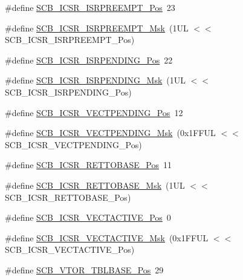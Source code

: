 \begin{DoxyCompactItemize}
\item 
\#define \hyperlink{group___c_m_s_i_s___s_c_b_ga11cb5b1f9ce167b81f31787a77e575df}{S\+C\+B\+\_\+\+I\+C\+S\+R\+\_\+\+I\+S\+R\+P\+R\+E\+E\+M\+P\+T\+\_\+\+Pos}~23
\item 
\#define \hyperlink{group___c_m_s_i_s___s_c_b_gaa966600396290808d596fe96e92ca2b5}{S\+C\+B\+\_\+\+I\+C\+S\+R\+\_\+\+I\+S\+R\+P\+R\+E\+E\+M\+P\+T\+\_\+\+Msk}~(1\+U\+L $<$$<$ S\+C\+B\+\_\+\+I\+C\+S\+R\+\_\+\+I\+S\+R\+P\+R\+E\+E\+M\+P\+T\+\_\+\+Pos)
\item 
\#define \hyperlink{group___c_m_s_i_s___s_c_b_ga10749d92b9b744094b845c2eb46d4319}{S\+C\+B\+\_\+\+I\+C\+S\+R\+\_\+\+I\+S\+R\+P\+E\+N\+D\+I\+N\+G\+\_\+\+Pos}~22
\item 
\#define \hyperlink{group___c_m_s_i_s___s_c_b_ga056d74fd538e5d36d3be1f28d399c877}{S\+C\+B\+\_\+\+I\+C\+S\+R\+\_\+\+I\+S\+R\+P\+E\+N\+D\+I\+N\+G\+\_\+\+Msk}~(1\+U\+L $<$$<$ S\+C\+B\+\_\+\+I\+C\+S\+R\+\_\+\+I\+S\+R\+P\+E\+N\+D\+I\+N\+G\+\_\+\+Pos)
\item 
\#define \hyperlink{group___c_m_s_i_s___s_c_b_gada60c92bf88d6fd21a8f49efa4a127b8}{S\+C\+B\+\_\+\+I\+C\+S\+R\+\_\+\+V\+E\+C\+T\+P\+E\+N\+D\+I\+N\+G\+\_\+\+Pos}~12
\item 
\#define \hyperlink{group___c_m_s_i_s___s_c_b_gacb6992e7c7ddc27a370f62878a21ef72}{S\+C\+B\+\_\+\+I\+C\+S\+R\+\_\+\+V\+E\+C\+T\+P\+E\+N\+D\+I\+N\+G\+\_\+\+Msk}~(0x1\+F\+F\+U\+L $<$$<$ S\+C\+B\+\_\+\+I\+C\+S\+R\+\_\+\+V\+E\+C\+T\+P\+E\+N\+D\+I\+N\+G\+\_\+\+Pos)
\item 
\#define \hyperlink{group___c_m_s_i_s___s_c_b_ga403d154200242629e6d2764bfc12a7ec}{S\+C\+B\+\_\+\+I\+C\+S\+R\+\_\+\+R\+E\+T\+T\+O\+B\+A\+S\+E\+\_\+\+Pos}~11
\item 
\#define \hyperlink{group___c_m_s_i_s___s_c_b_gaca6fc3f79bb550f64fd7df782ed4a5f6}{S\+C\+B\+\_\+\+I\+C\+S\+R\+\_\+\+R\+E\+T\+T\+O\+B\+A\+S\+E\+\_\+\+Msk}~(1\+U\+L $<$$<$ S\+C\+B\+\_\+\+I\+C\+S\+R\+\_\+\+R\+E\+T\+T\+O\+B\+A\+S\+E\+\_\+\+Pos)
\item 
\#define \hyperlink{group___c_m_s_i_s___s_c_b_gae4f602c7c5c895d5fb687b71b0979fc3}{S\+C\+B\+\_\+\+I\+C\+S\+R\+\_\+\+V\+E\+C\+T\+A\+C\+T\+I\+V\+E\+\_\+\+Pos}~0
\item 
\#define \hyperlink{group___c_m_s_i_s___s_c_b_ga5533791a4ecf1b9301c883047b3e8396}{S\+C\+B\+\_\+\+I\+C\+S\+R\+\_\+\+V\+E\+C\+T\+A\+C\+T\+I\+V\+E\+\_\+\+Msk}~(0x1\+F\+F\+U\+L $<$$<$ S\+C\+B\+\_\+\+I\+C\+S\+R\+\_\+\+V\+E\+C\+T\+A\+C\+T\+I\+V\+E\+\_\+\+Pos)
\item 
\#define \hyperlink{group___c_m_s_i_s___s_c_b_gad9720a44320c053883d03b883b955751}{S\+C\+B\+\_\+\+V\+T\+O\+R\+\_\+\+T\+B\+L\+B\+A\+S\+E\+\_\+\+Pos}~29
$$
\end{DoxyCompactItemize}
